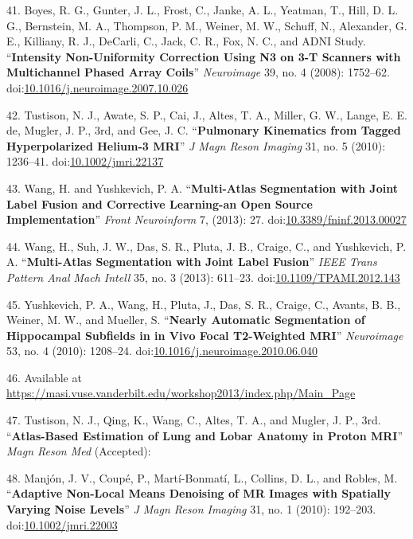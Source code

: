 \documentclass[11pt,]{article}
\begin{document}
41. Boyes, R. G., Gunter, J. L., Frost, C., Janke, A. L., Yeatman, T.,
Hill, D. L. G., Bernstein, M. A., Thompson, P. M., Weiner, M. W.,
Schuff, N., Alexander, G. E., Killiany, R. J., DeCarli, C., Jack, C. R.,
Fox, N. C., and ADNI Study. ``\textbf{Intensity Non-Uniformity
Correction Using N3 on 3-T Scanners with Multichannel Phased Array
Coils}'' \emph{Neuroimage} 39, no. 4 (2008): 1752--62.
doi:\href{http://dx.doi.org/10.1016/j.neuroimage.2007.10.026}{10.1016/j.neuroimage.2007.10.026}

42. Tustison, N. J., Awate, S. P., Cai, J., Altes, T. A., Miller, G. W.,
Lange, E. E. de, Mugler, J. P., 3rd, and Gee, J. C. ``\textbf{Pulmonary
Kinematics from Tagged Hyperpolarized Helium-3 MRI}'' \emph{J Magn Reson
Imaging} 31, no. 5 (2010): 1236--41.
doi:\href{http://dx.doi.org/10.1002/jmri.22137}{10.1002/jmri.22137}

43. Wang, H. and Yushkevich, P. A. ``\textbf{Multi-Atlas Segmentation
with Joint Label Fusion and Corrective Learning-an Open Source
Implementation}'' \emph{Front Neuroinform} 7, (2013): 27.
doi:\href{http://dx.doi.org/10.3389/fninf.2013.00027}{10.3389/fninf.2013.00027}

44. Wang, H., Suh, J. W., Das, S. R., Pluta, J. B., Craige, C., and
Yushkevich, P. A. ``\textbf{Multi-Atlas Segmentation with Joint Label
Fusion}'' \emph{IEEE Trans Pattern Anal Mach Intell} 35, no. 3 (2013):
611--23.
doi:\href{http://dx.doi.org/10.1109/TPAMI.2012.143}{10.1109/TPAMI.2012.143}

45. Yushkevich, P. A., Wang, H., Pluta, J., Das, S. R., Craige, C.,
Avants, B. B., Weiner, M. W., and Mueller, S. ``\textbf{Nearly Automatic
Segmentation of Hippocampal Subfields in in Vivo Focal T2-Weighted
MRI}'' \emph{Neuroimage} 53, no. 4 (2010): 1208--24.
doi:\href{http://dx.doi.org/10.1016/j.neuroimage.2010.06.040}{10.1016/j.neuroimage.2010.06.040}

46. Available at
\url{https://masi.vuse.vanderbilt.edu/workshop2013/index.php/Main_Page}

47. Tustison, N. J., Qing, K., Wang, C., Altes, T. A., and Mugler, J.
P., 3rd. ``\textbf{Atlas-Based Estimation of Lung and Lobar Anatomy in
Proton MRI}'' \emph{Magn Reson Med} (Accepted):

48. Manj{ó}n, J. V., Coup{é}, P., Mart{í}-Bonmat{í}, L., Collins, D. L.,
and Robles, M. ``\textbf{Adaptive Non-Local Means Denoising of MR Images
with Spatially Varying Noise Levels}'' \emph{J Magn Reson Imaging} 31,
no. 1 (2010): 192--203.
doi:\href{http://dx.doi.org/10.1002/jmri.22003}{10.1002/jmri.22003}
\end{document}
